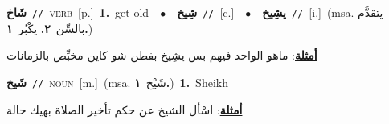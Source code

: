 \documentclass[10pt,a4paper,twoside]{article} %
\begin{document}
\begin{multicols}{2}
{\setlength\topsep{0pt}\textbf{\foreignlanguage{arabic}{شَاخ}}\ {\color{gray}\texttt{//}\color{black}}\ \textsc{verb}\ [p.]\ \textbf{1.}~get old\ \ $\bullet$\ \ \setlength\topsep{0pt}\textbf{\foreignlanguage{arabic}{شِيخ}}\ {\color{gray}\texttt{//}\color{black}}\ [c.]\ \ $\bullet$\ \ \setlength\topsep{0pt}\textbf{\foreignlanguage{arabic}{يشِيخ}}\ {\color{gray}\texttt{//}\color{black}}\ [i.]\ \color{gray}(msa. \foreignlanguage{arabic}{يتقدَّم بالسِّن}~\foreignlanguage{arabic}{\textbf{٢.}}  \foreignlanguage{arabic}{يكْبُر}~\foreignlanguage{arabic}{\textbf{١.}})\color{black}\  \begin{flushright}\color{gray}\foreignlanguage{arabic}{\textbf{\underline{\foreignlanguage{arabic}{أمثلة}}}: ماهو الواحد فيهم بس يشِيخ بفطن شو كاين مخبِّص بالزمانات}\end{flushright}\color{black}} \vspace{2mm}

{\setlength\topsep{0pt}\textbf{\foreignlanguage{arabic}{شَيخ}}\ {\color{gray}\texttt{//}\color{black}}\ \textsc{noun}\ [m.]\ \color{gray}(msa. \foreignlanguage{arabic}{شَيْخ}~\foreignlanguage{arabic}{\textbf{١.}})\color{black}\ \textbf{1.}~Sheikh\  \begin{flushright}\color{gray}\foreignlanguage{arabic}{\textbf{\underline{\foreignlanguage{arabic}{أمثلة}}}: اسْأل الشيخ عن حكم تأخير الصلاة بهيك حالة}\end{flushright}\color{black}} \vspace{2mm}


\end{multicols}
\end{document}
